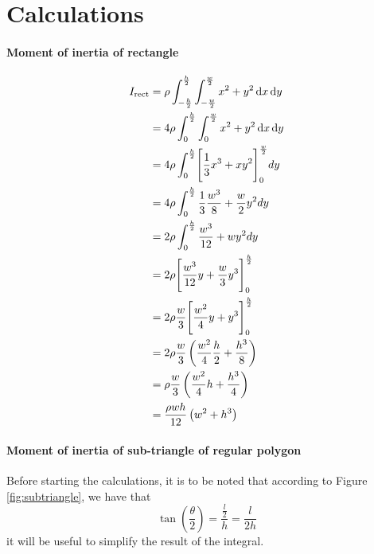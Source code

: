 \appendix

\section{Calculations}
\label{appendix:calculations}

\paragraph{Moment of inertia of rectangle}
\begin{equation}
	\label{eq:rect_moment_long}
	\begin{split}
		I_{\text{rect}} & =
		\rho \int_{-\frac{h}{2}}^{\frac{h}{2}} \int_{-\frac{w}{2}}^{\frac{w}{2}}  x^2 + y^2 \mathop{}\!\mathrm{d} x \mathop{}\!\mathrm{d} y           \\
		& = 4 \rho \int_{0}^{\frac{h}{2}} \int_{0}^{\frac{w}{2}}  x^2 + y^2 \mathop{}\!\mathrm{d} x \mathop{}\!\mathrm{d} y           \\
		& = 4 \rho \int_{0}^{\frac{h}{2}} \Biggl[\frac{1}{3} x^3 + x y^2 \Biggr]_{0}^{\frac{w}{2}} dy \\
		& = 4 \rho \int_{0}^{\frac{h}{2}} \frac{1}{3} \frac{w^3}{8} + \frac{w}{2} y^2 dy              \\
		& = 2 \rho \int_{0}^{\frac{h}{2}} \frac{w^3}{12} + w y^2 dy                                   \\
		& = 2 \rho \Biggl[ \frac{w^3}{12}  y + \frac{w}{3} y^3 \Biggr]_{0}^{\frac{h}{2}}              \\
		& = 2 \rho \frac{w}{3} \Biggl[ \frac{w^2}{4}y + y^3 \Biggr]_{0}^{\frac{h}{2}}                 \\
		& = 2 \rho \frac{w}{3} \left( \frac{w^2}{4}\frac{h}{2} + \frac{h^3}{8} \right)                \\
		& = \rho \frac{w}{3} \left( \frac{w^2}{4}h + \frac{h^3}{4} \right)                            \\
		& = \frac{\rho wh}{12} \left( w^2 + h^3 \right)                                               \\
	\end{split}
\end{equation}

\newpage
\paragraph{Moment of inertia of sub-triangle of regular polygon}
Before starting the calculations, it is to be noted that according to Figure
\ref{fig:subtriangle}, we have that
$$ \tan\left(\frac{\theta}{2}\right) = \frac{\frac{l}{2}}{h} = \frac{l}{2h} $$
it will be useful to simplify the result of the integral.

